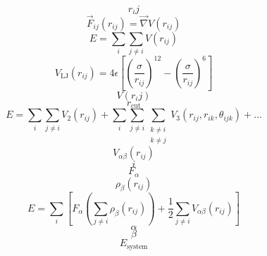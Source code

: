 \documentclass{scrreprt}
\begin{document}
\begin{equation}
r_ij
\end{equation}
\begin{equation}
  \vec F_{ij}(r_{ij}) = \vec\nabla V(r_{ij})
\end{equation}
\begin{equation}
  E = \sum_i\sum_{j \neq i}{V(r_{ij})}
\end{equation}
\begin{equation}
  V_\text{LJ}(r_{ij}) = 4 \epsilon \left[\left(\frac{\sigma}{r_{ij}}\right)^{12} - \left(\frac{\sigma}{r_{ij}}\right)^{6}\right]
\end{equation}
\begin{equation}
V(r_ij)
\end{equation}
\begin{equation}
r_\text{cut}
\end{equation}
\begin{equation}
  E = \sum_i\sum_{j \neq i}{V_2\left(r_{ij}\right)} + \sum_i\sum_{j \neq i}\sum_{\substack{k \neq i \\ k \neq j}}{V_3\left(r_{ij}, r_{ik}, \theta_{ijk}\right)} + \dots
\end{equation}
\begin{equation}
V_{\alpha\beta}(r_{ij})
\end{equation}
\begin{equation}
i
\end{equation}
\begin{equation}
F_\alpha
\end{equation}
\begin{equation}
\rho_\beta(r_{ij})
\end{equation}
\begin{equation}
  E = \sum_i\left[F_\alpha\left(\sum_{j\neq i}{\rho_\beta\left(r_{ij}\right)}\right) + \frac{1}{2}\sum_{j\neq i}{V_{\alpha\beta}\left(r_{ij}\right)}\right]
\end{equation}
\begin{equation}
\alpha
\end{equation}
\begin{equation}
\beta
\end{equation}
\begin{equation}
E_\text{system}
\end{equation}
\end{document}
